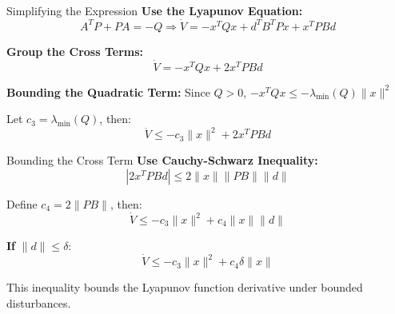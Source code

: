 \documentclass[student, noshadow, lsr, english, aspectratio=169, t]{ITR_LSR_slides}
\begin{document}
\begin{frame}{Simplifying the Expression}
    \textbf{Use the Lyapunov Equation:}
    \[
    A^T P + P A = -Q
    \Rightarrow \dot{V} = -x^T Q x + d^T B^T P x + x^T P B d
    \]
    
    \textbf{Group the Cross Terms:}
    \[
    \dot{V} = -x^T Q x + 2 x^T P B d
    \]
    
    \textbf{Bounding the Quadratic Term:}
    Since \( Q > 0 \), \( -x^T Q x \leq -\lambda_{\min}(Q) \|x\|^2 \)
    
    Let \( c_3 = \lambda_{\min}(Q) \), then:
    \[
    \dot{V} \leq -c_3 \|x\|^2 + 2 x^T P B d
    \]
    \end{frame}
    
    \begin{frame}{Bounding the Cross Term}
    \textbf{Use Cauchy-Schwarz Inequality:}
    \[
    |2 x^T P B d| \leq 2 \|x\| \|P B\| \|d\|
    \]
    
    Define \( c_4 = 2 \|P B\| \), then:
    \[
    \dot{V} \leq -c_3 \|x\|^2 + c_4 \|x\| \|d\|
    \]
    
    \textbf{If} \( \|d\| \leq \delta \):
    \[
    \dot{V} \leq -c_3 \|x\|^2 + c_4 \delta \|x\|
    \]
    
    This inequality bounds the Lyapunov function derivative under bounded disturbances.
\end{frame}
\end{document}
